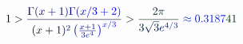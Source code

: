 \documentclass[12pt]{article}
\begin{document}
\makeatletter
\renewcommand*{\@textcolor}[3]{%
  \protect\leavevmode
  \begingroup
    \color#1{#2}#3%
  \endgroup
}
\makeatother
\begin{displaymath}
\mathcolor[RGB]{0,0,15}{1} \mathcolor[RGB]{0,0,30}{>} \mathcolor[RGB]{0,0,45}{\frac { \mathcolor[RGB]{0,0,60}{\Gamma} \mathcolor[RGB]{0,0,75}{(} \mathcolor[RGB]{0,0,90}{x} \mathcolor[RGB]{0,0,105}{+} \mathcolor[RGB]{0,0,120}{1} \mathcolor[RGB]{0,0,135}{)} \mathcolor[RGB]{0,0,150}{\Gamma} \mathcolor[RGB]{0,0,165}{(} \mathcolor[RGB]{0,0,180}{x} \mathcolor[RGB]{0,0,195}{/} \mathcolor[RGB]{0,0,210}{3} \mathcolor[RGB]{0,0,225}{+} \mathcolor[RGB]{0,0,240}{2} \mathcolor[RGB]{0,0,255}{)} } { \mathcolor[RGB]{0,15,0}{(} \mathcolor[RGB]{0,15,15}{x} \mathcolor[RGB]{0,15,30}{+} \mathcolor[RGB]{0,15,45}{1} \mathcolor[RGB]{0,15,60}{)} ^ { \mathcolor[RGB]{0,15,75}{2} } \mathcolor[RGB]{0,15,90}{\left(} \mathcolor[RGB]{0,15,105}{\frac { \mathcolor[RGB]{0,15,120}{x} \mathcolor[RGB]{0,15,135}{+} \mathcolor[RGB]{0,15,150}{1} } { \mathcolor[RGB]{0,15,165}{3} \mathcolor[RGB]{0,15,180}{e} ^ { \mathcolor[RGB]{0,15,195}{4} } } } \mathcolor[RGB]{0,15,210}{\right)} ^ { \mathcolor[RGB]{0,15,225}{x} \mathcolor[RGB]{0,15,240}{/} \mathcolor[RGB]{0,15,255}{3} } } } \mathcolor[RGB]{0,30,0}{>} \mathcolor[RGB]{0,30,15}{\frac { \mathcolor[RGB]{0,30,30}{2} \mathcolor[RGB]{0,30,45}{\pi} } { \mathcolor[RGB]{0,30,60}{3} \mathcolor[RGB]{0,30,75}{\sqrt { \mathcolor[RGB]{0,30,90}{3} } } \mathcolor[RGB]{0,30,105}{e} ^ { \mathcolor[RGB]{0,30,120}{4} \mathcolor[RGB]{0,30,135}{/} \mathcolor[RGB]{0,30,150}{3} } } } \mathcolor[RGB]{0,30,165}{\approx} \mathcolor[RGB]{0,30,180}{0} \mathcolor[RGB]{0,30,195}{.} \mathcolor[RGB]{0,30,210}{3} \mathcolor[RGB]{0,30,225}{1} \mathcolor[RGB]{0,30,240}{8} \mathcolor[RGB]{0,30,255}{7} \mathcolor[RGB]{0,45,0}{4} \mathcolor[RGB]{0,45,15}{1}
\end{displaymath}
\end{document}
